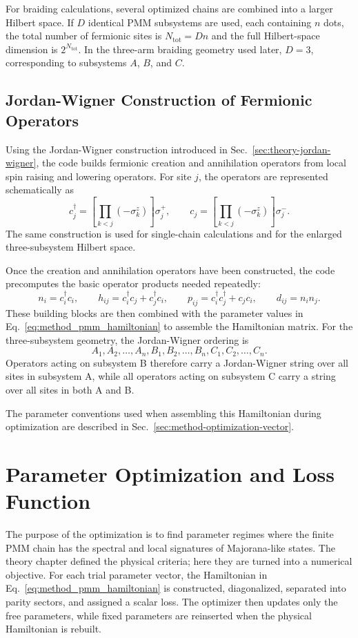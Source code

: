For braiding calculations, several optimized chains are combined into a larger Hilbert space. If $D$ identical PMM subsystems are used, each containing $n$ dots, the total number of fermionic sites is $N_{\mathrm{tot}}=Dn$ and the full Hilbert-space dimension is $2^{N_{\mathrm{tot}}}$. In the three-arm braiding geometry used later, $D=3$, corresponding to subsystems $A$, $B$, and $C$.

\subsection{Jordan-Wigner Construction of Fermionic Operators}
\label{sec:method-jordan-wigner-construction}
Using the Jordan-Wigner construction introduced in Sec.~\ref{sec:theory-jordan-wigner}, the code builds fermionic creation and annihilation operators from local spin raising and lowering operators. For site $j$, the operators are represented schematically as
\begin{equation}
c_j^\dagger =
\left[\prod_{k<j}(-\sigma_k^z)\right]\sigma_j^+,
\qquad
c_j =
\left[\prod_{k<j}(-\sigma_k^z)\right]\sigma_j^-.
\label{eq:method_jw_operators}
\end{equation}
The same construction is used for single-chain calculations and for the enlarged three-subsystem Hilbert space.

Once the creation and annihilation operators have been constructed, the code precomputes the basic operator products needed repeatedly:
\begin{equation}
n_i=c_i^\dagger c_i,\qquad
h_{ij}=c_i^\dagger c_j+c_j^\dagger c_i,\qquad
p_{ij}=c_i^\dagger c_j^\dagger+c_j c_i,\qquad
d_{ij}=n_i n_j .
\end{equation}
These building blocks are then combined with the parameter values in Eq.~\ref{eq:method_pmm_hamiltonian} to assemble the Hamiltonian matrix. 
For the three-subsystem geometry, the Jordan-Wigner ordering is
$$
A_1, A_2, \ldots, A_n, B_1, B_2, \ldots, B_n, C_1, C_2, \ldots, C_n.
$$
Operators acting on subsystem B therefore carry a Jordan-Wigner string over all sites in subsystem A, while all operators acting on subsystem C carry a string over all sites in both A and B.

The parameter conventions used when assembling this Hamiltonian during optimization are described in Sec.~\ref{sec:method-optimization-vector}.

\section{Parameter Optimization and Loss Function}
The purpose of the optimization is to find parameter regimes where the finite PMM chain has the spectral and local signatures of Majorana-like states. The theory chapter defined the physical criteria; here they are turned into a numerical objective. For each trial parameter vector, the Hamiltonian in Eq.~\ref{eq:method_pmm_hamiltonian} is constructed, diagonalized, separated into parity sectors, and assigned a scalar loss. The optimizer then updates only the free parameters, while fixed parameters are reinserted when the physical Hamiltonian is rebuilt.

